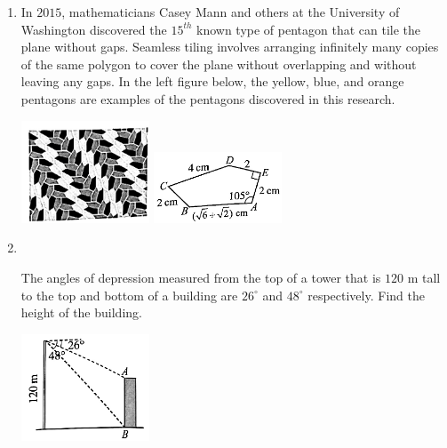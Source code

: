 \documentclass{report}
\begin{document}
\begin{enumerate}
        \vspace{-4em}
        \item In $2015$, mathematicians Casey Mann and others at the University of Washington discovered the $15^{th}$ known type of pentagon that can tile the plane without gaps. Seamless tiling involves arranging infinitely many copies of the same polygon to cover the plane without overlapping and without leaving any gaps. In the left figure below, the yellow, blue, and orange pentagons are examples of the pentagons discovered in this research.
        \begin{center}
            \includegraphics[width=0.3\textwidth]{assets/10-88.jpg}
            \hspace{3em}
            \includegraphics[width=0.3\textwidth]{assets/10-89.jpg}
        \end{center}

        \item \parbox[t]{0.9\textwidth}{
            ~
            \vspace{-1.1em}
            \begin{vwcol}[widths={0.6,0.4}, sep=8mm, rule=0pt]
               The angles of depression measured from the top of a tower that is $120$ m tall to the top and bottom of a building are $26^{\circ}$ and $48^{\circ}$ respectively. Find the height of the building.
    
                \includegraphics[width=0.3\textwidth]{assets/10-90.jpg}
            \end{vwcol}
        }


\end{enumerate}
\end{document}
